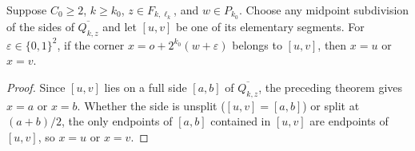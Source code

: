 \begin{lemma}
    \label{thm:area_law_dummy_corner_elementary_side}
    \leanok
    Suppose $C_0\ge2$, $k\ge k_0$, $z\in F_{k,\ell_k}$, and
    $w\in P_{k_0}$. Choose any midpoint subdivision of the sides of
    $\overline{Q_{k,z}}$ and let $[u,v]$ be one of its elementary segments.
    For $\varepsilon\in\{0,1\}^2$, if the corner
    $x=o+2^{k_0}(w+\varepsilon)$ belongs to $[u,v]$, then $x=u$ or $x=v$.
\end{lemma}
\begin{proof}\leanok
    Since $[u,v]$ lies on a full side $[a,b]$ of $\overline{Q_{k,z}}$, the
    preceding theorem gives $x=a$ or $x=b$. Whether the side is unsplit
    ($[u,v]=[a,b]$) or split at $(a+b)/2$, the only endpoints of $[a,b]$
    contained in $[u,v]$ are endpoints of $[u,v]$, so $x=u$ or $x=v$.
\end{proof}
